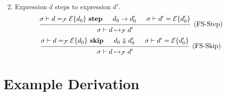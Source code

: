 \documentclass{article}
\newcommand{\evalsto}{\mathrel{\mathop{\Downarrow}}}
\newcommand{\entails}{\mathrel{\mathop{\vdash}}}
\newcommand{\istep}{~\mathbf{step}}
\newcommand{\iskip}{~\mathbf{skip}}
\begin{document}
\begin{enumerate}
\begin{enumerate}
\[        \]
    \end{enumerate}
  \item {} Expression \(d\) steps to expression
    \(d'\).
    \[
      \begin{prooftree}
        \hypo{\sigma \entails d =_\mathcal{F} \mathcal{E} \{ d_0 \} \istep}
        \hypo{d_0 \to d_0'}
        \hypo{\sigma \entails d' = \mathcal{E} \{ d_0' \}}
        \infer3[(FS-Step)]{\sigma \entails d \mapsto_\mathcal{F} d'}
      \end{prooftree}
    \]
    \[
      \begin{prooftree}
        \hypo{\sigma \entails d =_\mathcal{F} \mathcal{E} \{ d_0 \} \iskip}
        \hypo{d_0 \evalsto d_0'}
        \hypo{\sigma \entails d' = \mathcal{E} \{ d_0' \}}
        \infer3[(FS-Skip)]{\sigma \entails d \mapsto_\mathcal{F} d'}
      \end{prooftree}
    \]
\end{enumerate}

\section{Example Derivation}
\end{document}

